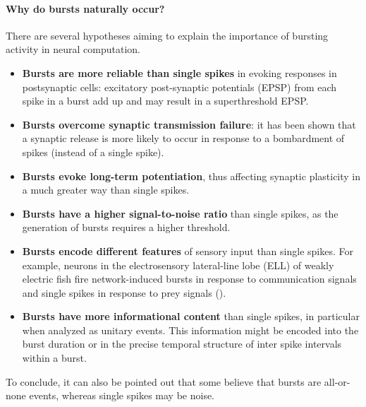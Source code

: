 \paragraph{Why do bursts naturally occur?}
There are several hypotheses aiming to explain the importance of bursting activity in
neural computation.
\begin{itemize}
    \item \textbf{Bursts are more reliable than single spikes} in evoking responses in
          postsynaptic cells: excitatory post-synaptic potentials (EPSP) from each spike in
          a burst add up and may result in a superthreshold EPSP.
    \item \textbf{Bursts overcome synaptic transmission failure}: it has been shown
          that a synaptic release is more likely to occur in response to a bombardment
          of spikes (instead of a single spike).
    \item \textbf{Bursts evoke long-term potentiation}, thus affecting synaptic
          plasticity in a much greater way than single spikes.
    \item \textbf{Bursts have a higher signal-to-noise ratio} than single spikes, as
          the generation of bursts requires a higher threshold.
    \item \textbf{Bursts encode different features} of sensory input than single
          spikes. For example, neurons in the electrosensory lateral-line lobe (ELL) of
          weakly electric fish fire network-induced bursts in response to communication
          signals and single spikes in response to prey signals ().
    \item \textbf{Bursts have more informational content} than single spikes, in
          particular when analyzed as unitary events. This information might be encoded
          into the burst duration or in the precise temporal structure of inter spike
          intervals within a burst.
\end{itemize}
To conclude, it can also be pointed out that some believe that bursts are all-or-none events,
whereas single spikes may be noise.
